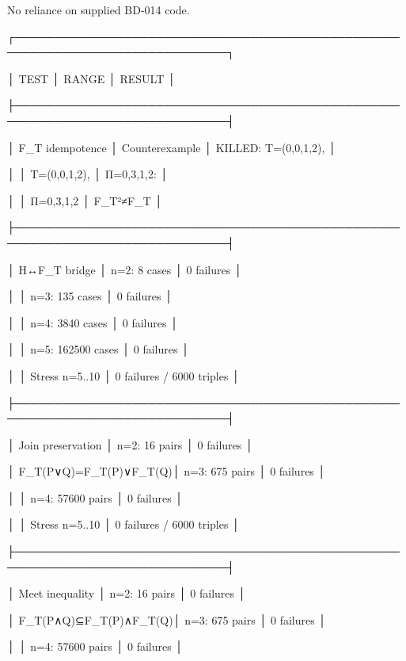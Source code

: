 No reliance on supplied BD-014 code.


┌─────────────────────────────────────────────────────────────────────────────┐

│ TEST                    │ RANGE              │ RESULT                        │

├─────────────────────────────────────────────────────────────────────────────┤

│ F_T idempotence         │ Counterexample     │ KILLED: T=(0,0,1,2),         │

│                         │ T=(0,0,1,2),       │ Π={{0,3},{1},{2}}:           │

│                         │ Π={{0,3},{1},{2}}  │ F_T²≠F_T                     │

├─────────────────────────────────────────────────────────────────────────────┤

│ H↔F_T bridge            │ n=2: 8 cases       │ 0 failures                   │

│                         │ n=3: 135 cases     │ 0 failures                   │

│                         │ n=4: 3840 cases    │ 0 failures                   │

│                         │ n=5: 162500 cases  │ 0 failures                   │

│                         │ Stress n=5..10     │ 0 failures / 6000 triples    │

├─────────────────────────────────────────────────────────────────────────────┤

│ Join preservation       │ n=2: 16 pairs      │ 0 failures                   │

│ F_T(P∨Q)=F_T(P)∨F_T(Q)│ n=3: 675 pairs     │ 0 failures                   │

│                         │ n=4: 57600 pairs   │ 0 failures                   │

│                         │ Stress n=5..10     │ 0 failures / 6000 triples    │

├─────────────────────────────────────────────────────────────────────────────┤

│ Meet inequality         │ n=2: 16 pairs      │ 0 failures                   │

│ F_T(P∧Q)⊆F_T(P)∧F_T(Q)│ n=3: 675 pairs     │ 0 failures                   │

│                         │ n=4: 57600 pairs   │ 0 failures                   │

